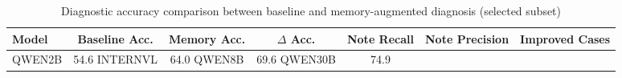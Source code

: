 \begin{table}[t]
\centering
\caption{Diagnostic accuracy comparison between baseline and memory-augmented diagnosis (selected subset)}
\label{tab:results_subset}
\begin{tabular}{lcccccc}
\toprule
Model & Baseline Acc. & Memory Acc. & $\Delta$ Acc. & Note Recall & Note Precision & Improved Cases \\
\midrule
QWEN2B & 54.6%
INTERNVL & 64.0%
QWEN8B & 69.6%
QWEN30B & 74.9%
\bottomrule
\end{tabular}
\end{table}
